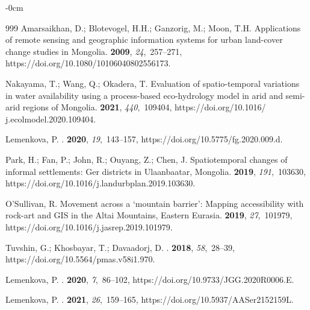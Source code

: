 \documentclass[geosciences,article,accept,pdftex,oneauthor]{Definitions/mdpi}
\begin{document}
\begin{adjustwidth}{-\extralength}{0cm}
\begin{thebibliography}{999}
Amarsaikhan, D.; Blotevogel, H.H.; Ganzorig, M.; Moon, T.H.
\newblock Applications of remote sensing and geographic information systems for
  urban land-cover change studies in Mongolia.
 {\bf 2009}, {\em 24},~257--271, https://doi.org/10.1080/10106040802556173.

Nakayama, T.; Wang, Q.; Okadera, T.
\newblock Evaluation of spatio-temporal variations in water availability using
  a process-based eco-hydrology model in arid and semi-arid regions of
  Mongolia.
 {\bf 2021}, {\em 440},~109404, https://doi.org/10.1016/ j.ecolmodel.2020.109404.

Lemenkova, P.
.
 {\bf 2020}, {\em 19},~143--157, https://doi.org/10.5775/fg.2020.009.d.

Park, H.; Fan, P.; John, R.; Ouyang, Z.; Chen, J.
\newblock Spatiotemporal changes of informal settlements: Ger districts in
  Ulaanbaatar, Mongolia.
 {\bf 2019}, {\em 191},~103630, https://doi.org/10.1016/j.landurbplan.2019.103630.

O'Sullivan, R.
\newblock Movement across a ‘mountain barrier’: Mapping accessibility with
  rock-art and GIS in the Altai Mountains, Eastern Eurasia.
 {\bf 2019}, {\em
  27},~101979, https://doi.org/10.1016/j.jasrep.2019.101979.

Tuvshin, G.; Khosbayar, T.; Davaadorj, D.
.
 {\bf 2018},
  {\em 58},~28--39, https://doi.org/10.5564/pmas.v58i1.970.

Lemenkova, P.
.
 {\bf 2020}, {\em
  7},~86--102, https://doi.org/10.9733/JGG.2020R0006.E.

Lemenkova, P.
.
 {\bf 2021}, {\em 26},~159--165, https://doi.org/10.5937/AASer2152159L.


\end{thebibliography}
\end{adjustwidth}
\end{document}
